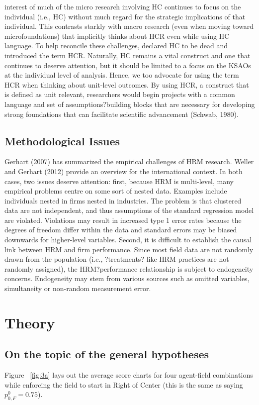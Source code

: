 \documentclass[12pt,letterpaper]{article}
\begin{document}
interest of much of the micro research involving HC continues to focus on the individual (i.e., HC) without much regard for the strategic implications of that individual. This contrasts starkly with macro research (even when moving toward microfoundations) that implicitly thinks about HCR even while using HC language. To help reconcile these challenges, \cite{Ployhart2014} declared HC to be dead and introduced the term HCR. Naturally, HC remains a vital construct and one that continues to deserve attention, but it should be limited to a focus on the KSAOs at the individual level of analysis. Hence, we too advocate for using the term HCR when thinking about unit-level outcomes. By using HCR, a construct that is defined as unit relevant, researchers would begin projects with a common
language and set of assumptions?building blocks that are necessary for developing strong foundations that can facilitate scientific advancement (Schwab, 1980).

\subsection{Methodological Issues}
Gerhart (2007) has summarized the empirical challenges of HRM research. Weller and Gerhart (2012) provide an overview for the international context. In both cases, two issues deserve attention: first, because HRM is multi-level, many empirical problems centre on some sort of nested data. Examples include individuals nested in firms nested in industries. The problem is that clustered data are not independent, and thus assumptions of the standard regression model are violated. Violations may result in increased type 1 error rates
because the degrees of freedom differ within the data and standard errors may be biased downwards for higher-level variables. Second, it is difficult to establish the causal link between HRM and firm performance. Since most field data are not randomly drawn from the population (i.e., ?treatments? like HRM practices are not randomly assigned), the HRM?performance relationship is subject to endogeneity concerns. Endogeneity may stem from various sources such as omitted variables, simultaneity or non-random measurement error.

\section{Theory}
\subsection{On the topic of the general hypotheses}
 Figure ~\ref{fig:3a} lays out the average score charts for four agent-field combinations while enforcing the field to start in Right of Center (this is the same as saying $p_{0,F}^0 = 0.75$). 
\end{document}
